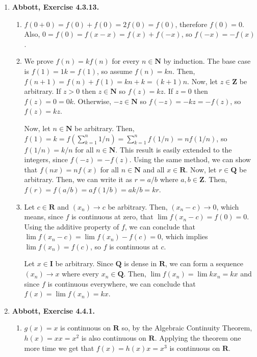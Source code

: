 \documentclass{article}
\makeatletter
\DeclarePairedDelimiter\abs{\lvert}{\rvert}
\let\oldabs\abs
\def\abs{\@ifstar{\oldabs}{\oldabs*}}
\newcommand{\N}{\mathbf{N}}
\newcommand{\Z}{\mathbf{Z}}
\newcommand{\Q}{\mathbf{Q}}
\newcommand{\I}{\mathbf{I}}
\newcommand{\R}{\mathbf{R}}
\newcommand{\exc}[2][Abbott]{\item \textbf{#1, Exercise #2.}}
\makeatother
\begin{document}
\begin{enumerate}
    Let $g(x) = \abs{x-a}$ for some $a \in F$ and $x \notin F$. Then, $g(x)$ is only $0$ when $x = a$, but $x \notin F$, so $x \neq a$ and $g(x) \neq 0$.
    
    \exc{4.3.13}
    \begin{enumerate}
        \item $f(0+0) = f(0) + f(0) = 2f(0) = f(0)$, therefore $f(0) = 0$. Also, $0 = f(0) = f(x-x) = f(x) + f(-x)$, so $f(-x) = -f(x)$.
        
        \item We prove $f(n) = k f(n)$ for every $n \in \N$ by induction. The base case is $f(1) = 1 k = f(1)$, so assume $f(n) = k n$. Then, $f(n+1) = f(n) + f(1) = k n + k = (k+1) n$. Now, let $z \in \Z$ be arbitrary. If $z > 0$ then $z \in \N$ so $f(z) = k z$. If $z = 0$ then $f(z) = 0 = 0 k$. Otherwise, $-z \in \N$ so $f(-z) = -k z = -f(z)$, so $f(z) = k z$. 
        
        Now, let $n \in \N$ be arbitrary. Then, $f(1) = k = f(\sum_{k=1}^n 1/n) = \sum_{k=1}^n f(1/n) = n f(1/n)$, so $f(1/n) = k/n$ for all $n \in \N$. This result is easily extended to the integers, since $f(-z)=-f(z)$. Using the same method, we can show that $f(n x) = n f(x)$ for all $n \in \N$ and all $x \in \R$. Now, let $r \in \Q$ be arbitrary. Then, we can write it as $r = a/b$ where $a,b \in \Z$. Then, $f(r)=f(a/b)= a f(1/b) = a k /b = k r$.
        
        \item Let $c \in \R$ and $(x_n) \to c$ be arbitrary. Then, $(x_n-c) \to 0$, which means, since $f$ is continuous at zero, that $\lim f(x_n -c) = f(0) = 0$. Using the additive property of $f$, we can conclude that $\lim f(x_n-c) = \lim f(x_n) - f(c) = 0$, which implies $\lim f(x_n) = f(c)$, so $f$ is continuous at $c$.
        
        Let $x \in \I$ be arbitrary. Since $\Q$ is dense in $\R$, we can form a sequence $(x_n) \to x$ where every $x_n \in \Q$. Then, $\lim f(x_n) = \lim k x_n = k x$ and since $f$ is continuous everywhere, we can conclude that $f(x) = \lim f(x_n) = k x$.
    \end{enumerate}
    
    \exc{4.4.1}
    \begin{enumerate}
        \item $g(x)=x$ is continuous on $\R$ so, by the Algebraic Continuity Theorem, $h(x)=x x = x^2$ is also continuous on $\R$. Applying the theorem one more time we get that $f(x) = h(x) x = x^3$ is continuous on $\R$.
        

\end{enumerate}
\end{enumerate}
\end{document}

